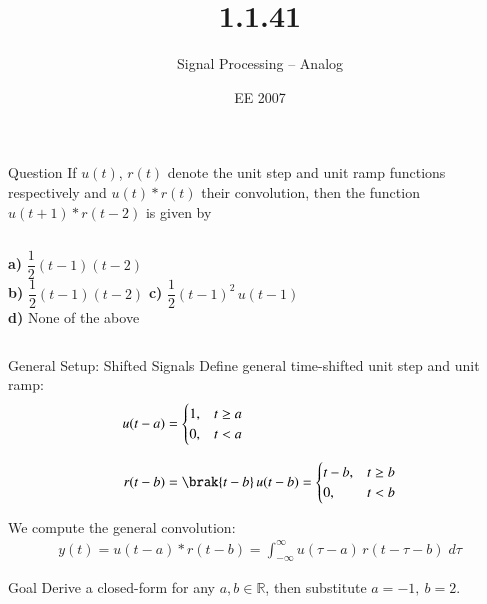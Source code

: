 \documentclass{beamer}
\begin{document}
\title{1.1.41}
\date{EE 2007}
\author{Signal Processing -- Analog}

\frame{\titlepage}

\begin{frame}{Question}
If $u(t)$, $r(t)$ denote the unit step and unit ramp functions respectively and $u(t)*r(t)$ their convolution, then the function $u(t+1)*r(t-2)$ is given by
\vspace{0.5cm}
\begin{columns}
    \textbf{a)} $\dfrac{1}{2}(t-1)(t-2)$\\[0.5cm]
    \textbf{b)} $\dfrac{1}{2}(t-1)(t-2)$
    \textbf{c)} $\dfrac{1}{2}(t-1)^2\,u(t-1)$\\[0.5cm]
    \textbf{d)} None of the above
\end{columns}
\end{frame}

\begin{frame}{General Setup: Shifted Signals}
Define general time-shifted unit step and unit ramp:
\begin{align}
    u(t-a) &= \begin{cases} 1, & t \geq a \\ 0, & t < a \end{cases} \\[0.3cm]
    r(t-b) &= \brak{t-b}\,u(t-b) = \begin{cases} t-b, & t \geq b \\ 0, & t < b \end{cases}
\end{align}

We compute the general convolution:
\begin{align}
    y(t) = u(t-a) * r(t-b) = \int_{-\infty}^{\infty} u(\tau - a)\,r(t-\tau-b)\;d\tau
\end{align}

\begin{block}{Goal}
    Derive a closed-form for any $a,b \in \mathbb{R}$, then substitute $a=-1,\ b=2$.
\end{block}
\end{frame}
\end{document}
